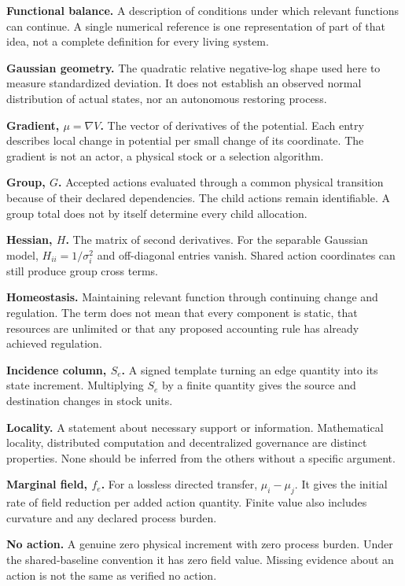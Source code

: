 \textbf{Functional balance.} A description of conditions under which relevant functions can continue. A single numerical reference is one representation of part of that idea, not a complete definition for every living system.

\textbf{Gaussian geometry.} The quadratic relative negative-log shape used here to measure standardized deviation. It does not establish an observed normal distribution of actual states, nor an autonomous restoring process.

\textbf{Gradient, $\mu=\nabla V$.} The vector of derivatives of the potential. Each entry describes local change in potential per small change of its coordinate. The gradient is not an actor, a physical stock or a selection algorithm.

\textbf{Group, $G$.} Accepted actions evaluated through a common physical transition because of their declared dependencies. The child actions remain identifiable. A group total does not by itself determine every child allocation.

\textbf{Hessian, $H$.} The matrix of second derivatives. For the separable Gaussian model, $H_{ii}=1/\sigma_i^2$ and off-diagonal entries vanish. Shared action coordinates can still produce group cross terms.

\textbf{Homeostasis.} Maintaining relevant function through continuing change and regulation. The term does not mean that every component is static, that resources are unlimited or that any proposed accounting rule has already achieved regulation.

\textbf{Incidence column, $S_e$.} A signed template turning an edge quantity into its state increment. Multiplying $S_e$ by a finite quantity gives the source and destination changes in stock units.

\textbf{Locality.} A statement about necessary support or information. Mathematical locality, distributed computation and decentralized governance are distinct properties. None should be inferred from the others without a specific argument.

\textbf{Marginal field, $f_e$.} For a lossless directed transfer, $\mu_i-\mu_j$. It gives the initial rate of field reduction per added action quantity. Finite value also includes curvature and any declared process burden.

\textbf{No action.} A genuine zero physical increment with zero process burden. Under the shared-baseline convention it has zero field value. Missing evidence about an action is not the same as verified no action.

